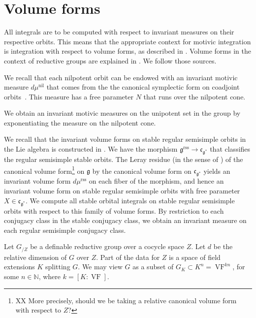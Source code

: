 \documentclass[12pt]{amsart}
\newcommand{\op}[1]{\operatorname{#1}}
\newcommand{\ring}[1]{{\mathbb #1}}
\def\VF{{\op{VF}}}
\newcommand{\fg}{\mathfrak{g}}
\newcommand{\fc}{\mathfrak{c}}
\newcommand{\reg}{\mathrm{rss}}
\theoremstyle{plain}
\theoremstyle{definition}
\begin{document}
\section{Volume forms}\cite{sec:volume}

All integrals are to be computed with respect to invariant measures on
their respective orbits.  This means that the appropriate context for
motivic integration is integration with respect to volume forms, as
described in \cite[Sec. 8]{CL}.    Volume forms in the context of
reductive groups are explained in \cite{shin-templier:b}.  We follow
those sources.

We recall that each nilpotent orbit can be endowed with an invariant
motivic measure $d\mu^{\op{nil}}$ that comes from the the canonical
symplectic form on coadjoint orbits~\cite[Prop.~4.3]{CGH}.  This
measure has a free parameter $N$ that runs over the nilpotent cone.

We obtain an invariant motivic measures on the unipotent set in the
group by exponentiating the measure on the nilpotent cone.

We recall that the invariant volume forms on stable regular semisimple
orbits in the Lie algebra is constructed in \cite{CHL}.  We have the
morphism $\fg^\reg\to\fc_{\fg^*}$ that classifies the regular
semisimple stable orbits.  The Leray residue (in the sense of
\cite{CL}) of the canonical volume form\footnote{XX More precisely,
  should we be taking a relative canonical volume form with respect to
  $Z$?} on $\fg$ by the canonical volume form on $\fc_{\fg^*}$ yields
an invariant volume form $d\mu^\reg$ on each fiber of the morphism,
and hence an invariant volume form on stable regular semisimple orbits
with free parameter $X\in\fc_{\fg^*}$.  We compute all stable orbital
integrals on stable regular semisimple orbits with respect to this
family of volume forms.  By restriction to each conjugacy class in the
stable conjugacy class, we obtain an invariant measure on each regular
semisimple conjugacy class.

Let $G_{/Z}$ be a definable reductive group over a cocycle space $Z$.
Let $d$ be the relative dimension of $G$ over $Z$.  Part of the data
for $Z$ is a space of field extensions $K$ splitting $G$.  We may view
$G$ as a subset of $G_K\subset K^n = \VF^{kn}$, for some $n\in\ring{N}$, where
$k=[K:\VF]$.
\end{document}
